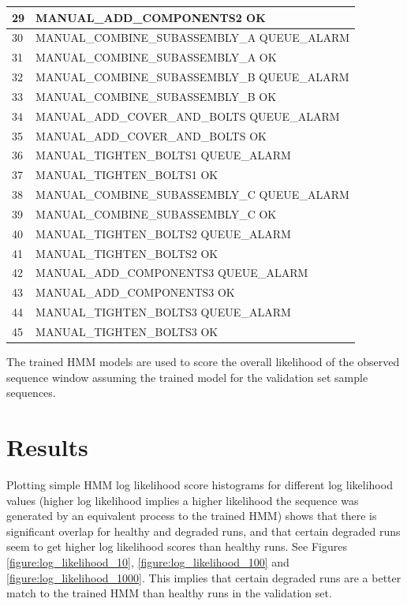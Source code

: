 \documentclass[journal]{IEEEtran}
\begin{document}
\begin{table}[!t]
\begin{tabular}{|p{5mm}|p{55mm}|}
29 & MANUAL\_ADD\_COMPONENTS2 OK \\
\hline
30 & MANUAL\_COMBINE\_SUBASSEMBLY\_A QUEUE\_ALARM \\
\hline
31 & MANUAL\_COMBINE\_SUBASSEMBLY\_A OK \\
\hline
32 & MANUAL\_COMBINE\_SUBASSEMBLY\_B QUEUE\_ALARM \\
\hline
33 & MANUAL\_COMBINE\_SUBASSEMBLY\_B OK \\
\hline
34 & MANUAL\_ADD\_COVER\_AND\_BOLTS QUEUE\_ALARM \\
\hline
35 & MANUAL\_ADD\_COVER\_AND\_BOLTS OK \\
\hline
36 & MANUAL\_TIGHTEN\_BOLTS1 QUEUE\_ALARM \\
\hline
37 & MANUAL\_TIGHTEN\_BOLTS1 OK \\
\hline
38 & MANUAL\_COMBINE\_SUBASSEMBLY\_C QUEUE\_ALARM \\
\hline
39 & MANUAL\_COMBINE\_SUBASSEMBLY\_C OK \\
\hline
40 & MANUAL\_TIGHTEN\_BOLTS2 QUEUE\_ALARM \\
\hline
41 & MANUAL\_TIGHTEN\_BOLTS2 OK \\
\hline
42 & MANUAL\_ADD\_COMPONENTS3 QUEUE\_ALARM \\
\hline
43 & MANUAL\_ADD\_COMPONENTS3 OK \\
\hline
44 & MANUAL\_TIGHTEN\_BOLTS3 QUEUE\_ALARM \\
\hline
45 & MANUAL\_TIGHTEN\_BOLTS3 OK \\
\hline
\end{tabular}
\end{table}

The trained HMM models are used to score the overall likelihood of the observed sequence window assuming the trained model for the validation set sample sequences.

\section{Results}

Plotting simple HMM log likelihood score histograms for different log likelihood values (higher log likelihood implies a higher likelihood the sequence was generated by an equivalent process to the trained HMM) shows that there is significant overlap for healthy and degraded runs, and that certain degraded runs seem to get higher log likelihood scores than healthy runs. See Figures \ref{figure:log_likelihood_10}, \ref{figure:log_likelihood_100} and \ref{figure:log_likelihood_1000}. This implies that certain degraded runs are a better match to the trained HMM than healthy runs in the validation set.
\end{document}
